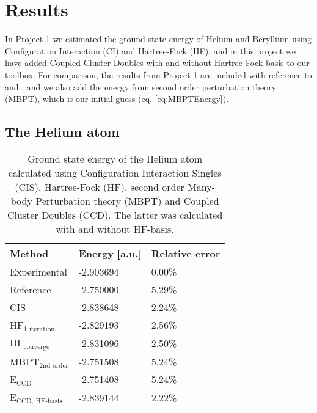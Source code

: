\documentclass[a4paper,12pt]{article}
\begin{document}
\section{Results} \label{sec:results}
In Project 1 we estimated the ground state energy of Helium and Beryllium using Configuration Interaction (CI) and Hartree-Fock (HF), and in this project we have added Coupled Cluster Doubles with and without Hartree-Fock basis to our toolbox. For comparison, the results from Project 1 are included with reference to \cite{project1even} and \cite{project1stian}, and we also add the energy from second order perturbation theory (MBPT), which is our initial guess (eq. \ref{eq:MBPTEnergy}). 


\subsection{The Helium atom}
\label{sec:HeliumResults}
\begin{table} [H]
	\caption{Ground state energy of the Helium atom calculated using Configuration Interaction Singles (CIS), Hartree-Fock (HF), second order Many-body Perturbation theory (MBPT) and Coupled Cluster Doubles (CCD). The latter was calculated with and without HF-basis.}
	\begin{tabularx}{\textwidth}{X|X|X} \hline\hline
		\textbf{Method}&\textbf{Energy} [a.u.]&\textbf{Relative error}\\ \hline
		Experimental & -2.903694 & 0.00\%  \\
		Reference & -2.750000 & 5.29\% \\
		CIS & -2.838648 &  2.24\% \\
		HF$_{\text{1 iteration}}$ & -2.829193 & 2.56\% \\
		HF$_{\text{converge}}$ & -2.831096 & 2.50\% \\
		MBPT$_{\text{2nd order}}$ & -2.751508 & 5.24\% \\
		E$_{\text{CCD}}$ & -2.751408 & 5.24\% \\
		E$_{\text{CCD, HF-basis}}$ & -2.839144 & 2.22\% \\ \hline\hline
	\end{tabularx}
	\label{tab:gs_he}
\end{table}
\end{document}
